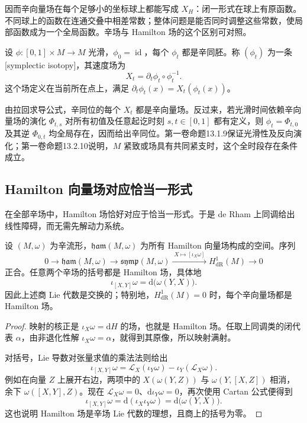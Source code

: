 因而辛向量场在每个足够小的坐标球上都能写成 \(X_H\)：闭一形式在球上有原函数。不同球上的函数在连通交叠中相差常数；整体问题是能否同时调整这些常数，使局部函数成为一个全局函数。辛场与 Hamilton 场的这个区别可对照\cite[定义5.2及其后的讨论，第140页]{Cannas2006Symplectic}。

\begin{definition}\label{g4:def:0903:symplectic-isotopy}
	设 \(\phi:[0,1]\times M\to M\) 光滑，\(\phi_0=\operatorname{id}\)，每个 \(\phi_t\) 都是辛同胚。称 \((\phi_t)\) 为一条[symplectic isotopy]，其速度场为
	\[
		X_t=\partial_t\phi_t\circ\phi_t^{-1}.
	\]
	这个场定义在当前所在点上，满足 \(\partial_t\phi_t(x)=X_t(\phi_t(x))\)。
\end{definition}

由拉回求导公式，辛同位的每个 \(X_t\) 都是辛向量场。反过来，若光滑时间依赖辛向量场的演化 \(\Phi_{t,s}\) 对所有初值及任意起讫时刻 \(s,t\in[0,1]\) 都有定义，则 \(\phi_t=\Phi_{t,0}\) 及其逆 \(\Phi_{0,t}\) 均全局存在，因而给出辛同位。第一卷命题13.1.9保证光滑性及反向演化；第一卷命题13.2.10说明，\(M\) 紧致或场具有共同紧支时，这个全时段存在条件成立。

\subsection{Hamilton 向量场对应恰当一形式}
\label{g4:subsec:0903:02}

在全部辛场中，Hamilton 场恰好对应于恰当一形式。于是 de Rham 上同调给出线性障碍，而无需先解动力系统。

\begin{proposition}\label{g4:prop:0903:infinitesimal-obstruction}
	设 \((M,\omega)\) 为辛流形，\(\mathfrak{ham}(M,\omega)\) 为所有 Hamilton 向量场构成的空间。序列
	\[
		0\longrightarrow\mathfrak{ham}(M,\omega)
		\longrightarrow\mathfrak{symp}(M,\omega)
		\xrightarrow{\;X\mapsto[\iota_X\omega]\;}
		H^1_{\mathrm{dR}}(M)\longrightarrow0
	\]
	正合。任意两个辛场的括号都是 Hamilton 场，具体地
	\[
		\iota_{[X,Y]}\omega=\mathrm{d}\bigl(\omega(Y,X)\bigr).
	\]
	因此上述商 Lie 代数是交换的；特别地，\(H^1_{\mathrm{dR}}(M)=0\) 时，每个辛向量场都是 Hamilton 场。
\end{proposition}
\begin{proof}
	映射的核正是 \(\iota_X\omega=\mathrm{d}H\) 的场，也就是 Hamilton 场。任取上同调类的闭代表 \(\alpha\)，由非退化性解 \(\iota_X\omega=\alpha\)，就得到其原像，所以映射满射。

	对括号，Lie 导数对张量求值的乘法法则给出
	\[
		\iota_{[X,Y]}\omega
		=\mathcal L_X(\iota_Y\omega)-\iota_Y(\mathcal L_X\omega).
	\]
	例如在向量 \(Z\) 上展开右边，两项中的 \(X(\omega(Y,Z))\) 与 \(\omega(Y,[X,Z])\) 相消，余下 \(\omega([X,Y],Z)\)。现在 \(\mathcal L_X\omega=0\)、\(\mathrm{d}\iota_Y\omega=0\)，再次使用 Cartan 公式便得到
	\[
		\iota_{[X,Y]}\omega
		=\mathrm{d}(\iota_X\iota_Y\omega)
		=\mathrm{d}\bigl(\omega(Y,X)\bigr).
	\]
	这也说明 Hamilton 场是辛场 Lie 代数的理想，且商上的括号为零。
\end{proof}

